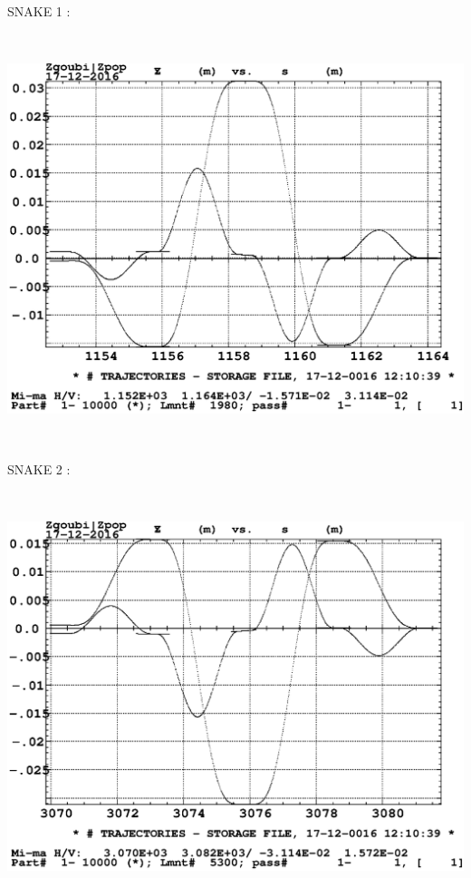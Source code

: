 \documentclass[10pt]{article}
\begin{document}
\begin{minipage}{1.\linewidth}
\begin{minipage}{.49\linewidth}
\centering

SNAKE 1 : 

~

\includegraphics*[bbllx=20,bblly=105,bburx=550,bbury=460,width=.9\linewidth]{orbit_snake1_45.5.eps} 

~

\end{minipage}
\begin{minipage}{.49\linewidth}
\centering
SNAKE 2 : 

~

\includegraphics*[bbllx=20,bblly=105,bburx=550,bbury=460,width=.9\linewidth]{orbit_snake2_45.5.eps} 


\end{minipage}

\end{minipage}
\end{document}
